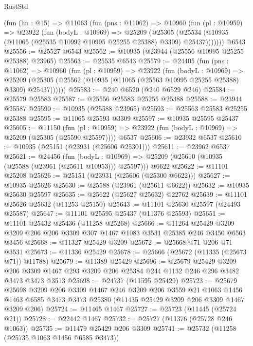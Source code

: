 \begin{lexlean}{RustStd}
\begin{coremodule}
{\begin{coremodule}
{{{{{{{{{{{{{{{{{{{{{{{{{{{{{{{{{{{{{{{{{{{{{{{{{{{{{{{{{{{{{{{{{{{{{{{{{{{{{{{{{{{{{    (fun (hn : @15) =>
    @11063
      (fun (pns : @11062) =>
      @10960
        (fun (pl : @10959) =>
        @23922
          (fun (bodyL : @10969) =>
          @25209
            (@25305
              (@25534 (@10935 (@11065 (@25535 @10992 @10995 @25255 @25388) @3309) @25437)))))))
    @6543
@25556 := @25527 @6543
@25562 := @10935 (@23944 (@25556 @10995 @25255 @25388) @23965)
@25563 := @25535 @6543
@25579 := @24405
    (fun (pns : @11062) =>
    @10960
      (fun (pl : @10959) =>
      @23922
        (fun (bodyL : @10969) =>
        @25209 (@25305 (@25562 (@10935 (@11065 (@25563 @10995 @25255 @25388) @3309) @25437))))))
@25583 := @240 @6520 (@240 @6529 @246)
@25584 := @25579 @25583
@25587 := @25556 @25583 @25255 @25388
@25588 := @23944 @25587
@25590 := @10935 (@25588 @23965)
@25593 := @25563 @25583 @25255 @25388
@25595 := @11065 @25593 @3309
@25597 := @10935 @25595 @25437
@25605 := @11150
    (fun (pl : @10959) => @23922 (fun (bodyL : @10969) => @25209 (@25305 (@25590 @25597))))
    @6537
@25606 := @23932 @6537
@25610 := @10935 (@25151 (@23931 (@25606 @25301)))
@25611 := @23962 @6537
@25621 := @24456
    (fun (bodyL : @10969) => @25209 (@25610 (@10935 (@25588 (@23961 (@25611 @10953))) @25597)))
    @6622
@25622 := @11101 @25208
@25626 := @25151 (@23931 (@25606 (@25300 @6622)))
@25627 := @10935 @25626
@25630 := @25588 (@23961 (@25611 @6622))
@25632 := @10935 @25630 @25597
@25635 := @25622 (@25627 @25632) @22762
@25639 := @11101 @25626 @25632 (@11253 @25150)
@25643 := @11101 @25630 @25597 (@24493 @25587)
@25647 := @11101 @25595 @25437 (@11376 @25593)
@25651 := @11101 @25432 @25436 (@11258 @25268)
@25666 := @11264
    @25429
    @3209
    @3209
    @206
    @206
    @3309
    @307
    @1467
    @1083
    @3531
    @25385
    @246
    @3450
    @6563
    @3456
@25668 := @11327 @25429 @3209
@25672 := @25668 @71 @206 @71 @3531
@25673 := @11336 @25429
@25678 := @25666 (@25672 (@11335 (@25673 @71)) @11788)
@25679 := @11389 @25429
@25696 := @25679
    @25429
    @3209
    @206
    @3309
    @1467
    @293
    @3209
    @206
    @25384
    @244
    @1132
    @246
    @296
    @3482
    @3473
    @3473
    @3513
@25698 := @24737 (@11595 @25429)
@25723 := @25679
    @25698
    @3209
    @206
    @3309
    @1467
    @246
    @3209
    @206
    @3559
    @21
    @1063
    @1456
    @1463
    @6585
    @3473
    @3473
    @25380
    (@11435 @25429 @3209 @206 @3309 @1467 @3209 @206)
@25724 := @11465 @1467
@25727 := @25723 (@11445 (@25724 @21))
@25728 := @22442 @1467
@25732 := @25727 (@11376 (@25728 @246 @1063))
@25735 := @11479 @25429 @206 @3309
@25741 := @25732 (@11258 (@25735 @1063 @1456 @6585 @3473))
}}}}}}}}}}}}}}}}}}}}}}}}}}}}}}}}}}}}}}}}}}}}}}}}}}}}}}}}}}}}}}}}}}}}}}}}}}}}}}}}}}}}}
\end{coremodule}}
\end{coremodule}
\end{lexlean}
